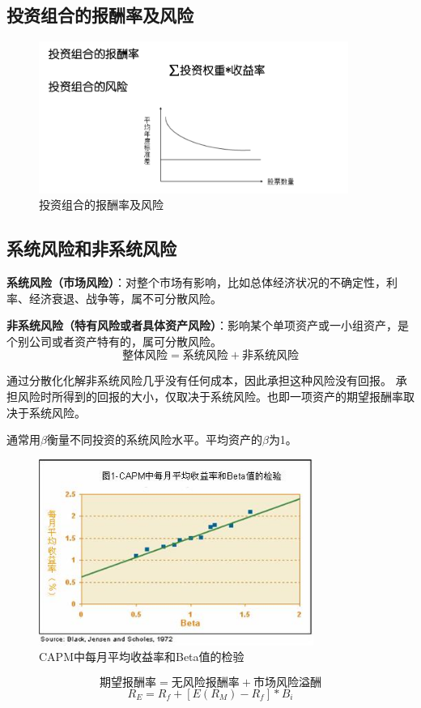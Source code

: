\documentclass[12pt, a4paper, oneside]{ctexbook}
\begin{document}
\subsection{投资组合的报酬率及风险}

\begin{figure}[H]
    \centering
    \includegraphics[width=0.9\textwidth]{image/投资组合的报酬率及风险.png}
    \caption{投资组合的报酬率及风险}
    \label{fig:10}
\end{figure}

\subsection{系统风险和非系统风险}
\textbf{系统风险（市场风险）}：对整个市场有影响，比如总体经济状况的不确定性，利率、经济衰退、战争等，属不可分散风险。

\textbf{非系统风险（特有风险或者具体资产风险）}：影响某个单项资产或一小组资产，是个别公司或者资产特有的，属可分散风险。
$$\mbox{整体风险}=\mbox{系统风险}+\mbox{非系统风险}$$

通过分散化化解非系统风险几乎没有任何成本，因此承担这种风险没有回报。
承担风险时所得到的回报的大小，仅取决于系统风险。也即一项资产的期望报酬率取决于系统风险。

通常用$\beta$衡量不同投资的系统风险水平。平均资产的$\beta$为1。

\begin{figure}[H]
    \centering
    \includegraphics[width=0.8\textwidth]{image/CAPM中每月平均收益率和Beta值的检验.jpg}
    \caption{CAPM中每月平均收益率和Beta值的检验}
    \label{fig:11}
\end{figure}
$$\mbox{期望报酬率}=\mbox{无风险报酬率}+\mbox{市场风险溢酬}$$
$$R_E=R_f+[E(R_M)-R_f]*B_i$$
\end{document}
